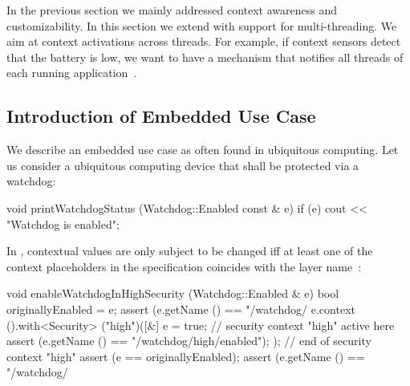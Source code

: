 In the previous section we mainly addressed context awareness and customizability.
In this section we extend  with support for multi-threading.
We aim at context activations across threads.
For example, if context sensors detect that the battery is low, we want to have a mechanism that notifies all threads of each running application~\cite{raab2015global}.

\subsection{Introduction of Embedded Use Case}

We describe an embedded use case as often found in ubiquitous computing.
Let us consider a ubiquitous computing device that shall be protected via a watchdog:

void printWatchdogStatus (Watchdog::Enabled const & e)
{
	if (e) { cout << "Watchdog is enabled"; }
}
\end{code}

In \elektra{}, contextual values are only subject to be changed iff at least one of the context placeholders in the specification coincides with the layer name~\cite{raab2015global}:

\begin{code}[language=Cpp]
void enableWatchdogInHighSecurity (Watchdog::Enabled & e)
{
	bool originallyEnabled = e;
	assert (e.getName () == "/watchdog/%
	e.context ().with<Security> ("high")([&]{
		e = true; // security context "high" active here
		assert (e.getName () == "/watchdog/high/enabled");
	}); // end of security context "high"
	assert (e == originallyEnabled);
	assert (e.getName () == "/watchdog/%
}
\end{code}

